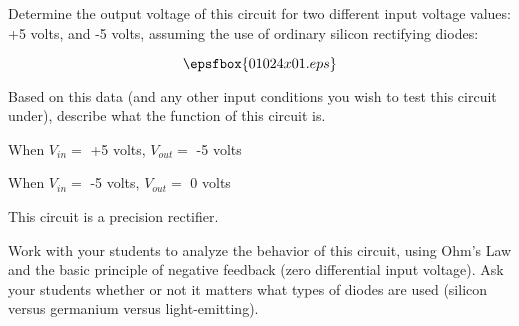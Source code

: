

Determine the output voltage of this circuit for two different input voltage values: +5 volts, and -5 volts, assuming the use of ordinary silicon rectifying diodes:

$$\epsfbox{01024x01.eps}$$

Based on this data (and any other input conditions you wish to test this circuit under), describe what the function of this circuit is.







When $V_{in} =$ +5 volts, $V_{out} =$ -5 volts

\vskip 10pt

When $V_{in} =$ -5 volts, $V_{out} =$ 0 volts

\vskip 10pt

This circuit is a precision rectifier.







Work with your students to analyze the behavior of this circuit, using Ohm's Law and the basic principle of negative feedback (zero differential input voltage).  Ask your students whether or not it matters what types of diodes are used (silicon versus germanium versus light-emitting).




